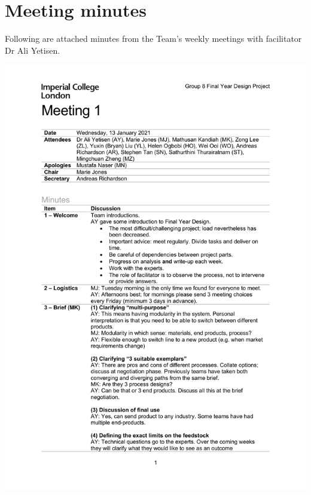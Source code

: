 \section{Meeting minutes}

Following are attached minutes from the Team's weekly meetings with facilitator Dr Ali Yetisen.

% 
\includegraphics{attachments/2021-01-13_minutes-signed.pdf}
% 
% 
% 
% 
% 
